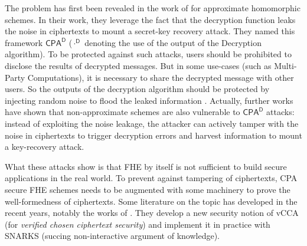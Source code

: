 The problem has first been revealed in the work of \cite{EC:LiMic21} for approximate homomorphic schemes. In their work, they leverage the fact that the decryption function leaks the noise in ciphertexts to mount a secret-key recovery attack. They named this framework $\textsf{CPA}^\textsf{D}$ ($\cdot ^ \textsf{D}$ denoting the use of the output of the Decryption algorithm). To be protected against such attacks, users should be prohibited to disclose the results of decrypted messages. But in some use-cases (such as Multi-Party Computations), it is necessary to share the decrypted message with other users. So the outputs of the decryption algorithm should be protected by injecting random noise to flood the leaked information \cite{EPRINT:CheHonKim20}. Actually, further works \cite{C:CSBB24, CCS:CCPSS24} have shown that non-approximate schemes are also vulnerable to $\textsf{CPA}^\textsf{D}$ attacks: instead of exploiting the noise leakage, the attacker can actively tamper with the noise in ciphertexts to trigger decryption errors and harvest information to mount a key-recovery attack.


What these attacks show is that FHE by itself is not sufficient to build secure applications in the real world. To prevent against tampering of ciphertexts, \textsf{CPA} secure FHE schemes needs to be augmented with some machinery to prove the well-formedness of ciphertexts. Some literature on the topic has developed in the recent years, notably the works of \cite{EC:ManNgu24, CiC:BCFPPR25}. They develop a new security notion of \textsf{vCCA} (for \textit{verified chosen ciphertext security}) and implement it in practice with SNARKS \cite{SNARKS} (succing non-interactive argument of knowledge). 


